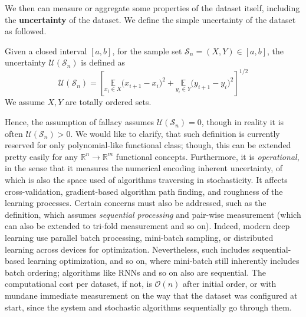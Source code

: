 We then can measure or aggregate some properties of the dataset itself, including the \textbf{uncertainty} of the dataset. We define the simple uncertainty of the dataset as followed. 

\begin{definition}
    Given a closed interval $[a,b]$, for the sample set $\mathcal{S}_{n}=(X,Y)\in [a,b]$, the uncertainty $\mathcal{U}(\mathcal{S}_{n})$ is defined as 
    \begin{equation}
        \mathcal{U}(\mathcal{S}_{n}) = \left[ \underset{x_{i}\in X}{\mathbb{E}}\Big( x_{i+1} - x_{i} \Big)^{2} + \underset{y_{i}\in Y}{\mathbb{E}} \Big( y_{i+1}- y_{i} \Big)^{2} \right]^{1/2}
    \end{equation}
    We assume $X,Y$ are totally ordered sets. 
\end{definition}

Hence, the assumption of fallacy assumes $\mathcal{U}(\mathcal{S}_{n})=0$, though in reality it is often $\mathcal{U}(\mathcal{S}_{n})>0$. We would like to clarify, that such definition is currently reserved for only polynomial-like functional class; though, this can be extended pretty easily for any $\mathbb{R}^{n}\to\mathbb{R}^{m}$ functional concepts. Furthermore, it is \textit{operational}, in the sense that it measures the numerical encoding inherent uncertainty, of which is also the space used of algorithms traversing in stochasticity. It affects cross-validation, gradient-based algorithm path finding, and roughness of the learning processes. Certain concerns must also be addressed, such as the definition, which assumes \textit{sequential processing} and pair-wise measurement (which can also be extended to tri-fold measurement and so on). Indeed, modern deep learning use parallel batch processing, mini-batch sampling, or distributed learning across devices for optimization. Nevertheless, such includes sequential-based learning optimization, and so on, where mini-batch still inherently includes batch ordering; algorithms like RNNs and so on also are sequential. The computational cost per dataset, if not, is $\mathcal{O}(n)$ after initial order, or with mundane immediate measurement on the way that the dataset was configured at start, since the system and stochastic algorithms sequentially go through them.

